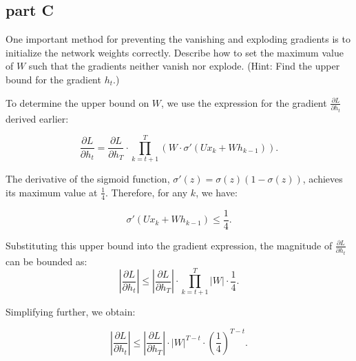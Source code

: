 \subsection{part C}
One important method for preventing the vanishing and exploding gradients is to initialize the network weights correctly. Describe how to set the maximum value of \( W \) such that the gradients neither vanish nor explode. (Hint: Find the upper bound for the gradient \( h_t \).)
\begin{qsolve}
  \begin{qsolve}[]

    To determine the upper bound on \( W \), we use the expression for the gradient \( \frac{\partial L}{\partial h_t} \) derived earlier:

    \[
    \frac{\partial L}{\partial h_t} = \frac{\partial L}{\partial h_T} \cdot \prod_{k=t+1}^T \left(W \cdot \sigma'(U x_k + W h_{k-1})\right).
    \]
    
    The derivative of the sigmoid function, \( \sigma'(z) = \sigma(z)(1 - \sigma(z)) \), achieves its maximum value at \( \frac{1}{4} \). Therefore, for any \( k \), we have:
    
    \[
    \sigma'(U x_k + W h_{k-1}) \leq \frac{1}{4}.
    \]
    
    Substituting this upper bound into the gradient expression, the magnitude of \( \frac{\partial L}{\partial h_t} \) can be bounded as:
    \splitqsolve[\splitqsolve]    
    \[
    \left| \frac{\partial L}{\partial h_t} \right| \leq \left| \frac{\partial L}{\partial h_T} \right| \cdot \prod_{k=t+1}^T \left| W \right| \cdot \frac{1}{4}.
    \]
    
    Simplifying further, we obtain:

    \[
    \left| \frac{\partial L}{\partial h_t} \right| \leq \left| \frac{\partial L}{\partial h_T} \right| \cdot |W|^{T-t} \cdot \left(\frac{1}{4}\right)^{T-t}.
    \]
    
  \end{qsolve}
\end{qsolve}
